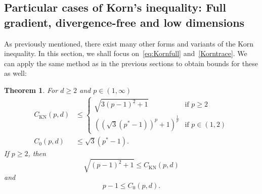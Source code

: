 \documentclass[11pt, a4paper]{amsart}
\newtheorem{theorem}{Theorem}[section]
\theoremstyle{definition}
\theoremstyle{remark}
\begin{document}
\subsection{Particular cases of Korn's inequality:
Full gradient, divergence-free and low dimensions}
As previously mentioned, there exist many other forms
and variants of the Korn inequality. 
In this section, we shall focus on~\eqref{eq:Kornfull}
and~\eqref{Korntrace}.
We can apply the same method as in the previous sections
to obtain bounds for these as well:
\begin{theorem} For $d\ge 2$ and $p\in (1,\infty)$
\begin{align*}
C_{\mathrm{KN}}(p,d)&\le \begin{cases}
\sqrt{3(p-1)^2+1}&\text{if }p\ge 2\\
\left((\sqrt{3}(p^*-1))^p+1\right)
^{\frac 1p}&\text{if }p\in(1,2)
\end{cases}\\
C_{0}(p,d)&\le \sqrt 3(p^*-1).
\end{align*}
If $p\ge 2$, then
\begin{equation*}
\sqrt{(p-1)^2+1}\le C_{\mathrm{KN}}(p,d)
\end{equation*}
and
\begin{equation*}
p-1\le C_0(p,d).
\end{equation*}
\end{theorem}
\end{document}
